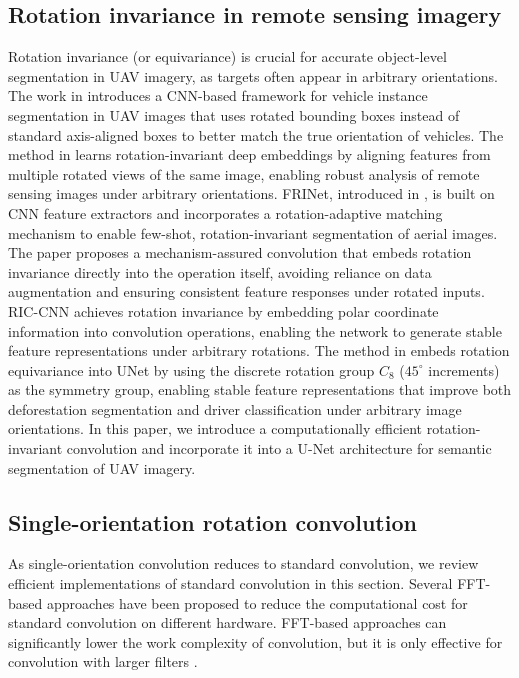 \subsection{Rotation invariance in remote sensing imagery} \label{subsec:seg-rsd}
Rotation invariance (or equivariance) is crucial for accurate object-level segmentation in UAV imagery, as targets often appear in arbitrary orientations.
The work in \cite{isprs-annals-V-1-2022-15-2022} introduces a CNN-based framework for vehicle instance segmentation in UAV images that uses rotated bounding boxes instead of standard axis-aligned boxes to better match the true orientation of vehicles.
The method in \cite{9466361} learns rotation-invariant deep embeddings by aligning features from multiple rotated views of the same image, enabling robust analysis of remote sensing images under arbitrary orientations. FRINet, introduced in \cite{10339376}, is built on CNN feature extractors and incorporates a rotation-adaptive matching mechanism to enable few-shot, rotation-invariant segmentation of aerial images. The paper \cite{mo2024achieving} proposes a mechanism-assured convolution that embeds rotation invariance directly into the operation itself, avoiding reliance on data augmentation and ensuring consistent feature responses under rotated inputs.
RIC-CNN \cite{mo2024ric} achieves rotation invariance by embedding polar coordinate information into convolution operations, enabling the network to generate stable feature representations under arbitrary rotations.
The method in \cite{mitton2021rotation} embeds rotation equivariance into UNet by using the discrete rotation group $C_8$ ($45^\circ$ increments) as the symmetry group, enabling stable feature representations that improve both deforestation segmentation and driver classification under arbitrary image orientations.
In this paper, we introduce a computationally efficient rotation-invariant convolution and incorporate it into a U-Net architecture for semantic segmentation of UAV imagery. 

\subsection{Single-orientation rotation convolution}\label{sec:dense-conv} \label{subsec:standard-conv}
As single-orientation convolution reduces to standard convolution, we review efficient implementations of standard convolution in this section. Several FFT-based approaches \cite{FFT1,FFT2,FFT3,FFT4} have been proposed to reduce the computational cost for standard convolution on different hardware. FFT-based approaches can significantly lower the work complexity of convolution, but it is only effective for convolution with larger filters \cite{cuDNN}. 

